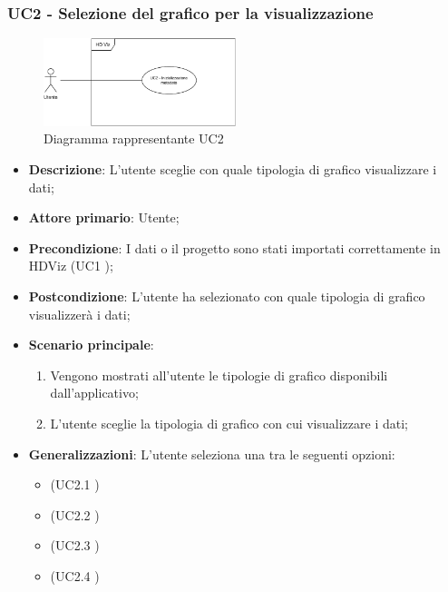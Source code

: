 \subsubsection{UC2 - Selezione del grafico per la visualizzazione}
\label{sub:uc2}

\begin{figure}[h]
    \centering
    \includegraphics[width=0.5\textwidth]{componenti/casi-duso/diagrammi/UC2.pdf}
    \caption{Diagramma rappresentante UC2}
    \label{fig:UC2}
\end{figure}

\begin{itemize}
	\item \textbf{Descrizione}: L'utente sceglie con quale tipologia di grafico visualizzare i dati;
	\item \textbf{Attore primario}: Utente;
	\item \textbf{Precondizione}: I dati o il progetto sono stati importati correttamente in HDViz (UC1 );
	\item \textbf{Postcondizione}: L'utente ha selezionato con quale tipologia di grafico visualizzerà i dati;
	\item \textbf{Scenario principale}:
		\begin{enumerate}
			\item Vengono mostrati all'utente le tipologie di grafico disponibili dall'applicativo;
			\item L'utente sceglie la tipologia di grafico con cui visualizzare i dati;
		\end{enumerate}
	\item \textbf{Generalizzazioni}: L'utente seleziona una tra le seguenti opzioni:
		\begin{itemize}
			\item {} (UC2.1 )
			\item {} (UC2.2 )
			\item {} (UC2.3 )
			\item {} (UC2.4 )
		\end{itemize}
\end{itemize}

